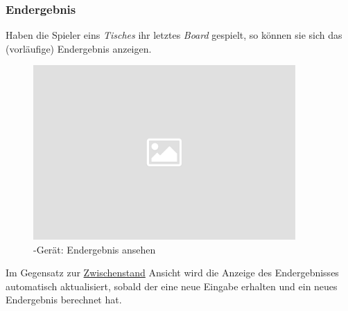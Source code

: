 \subsubsection{Endergebnis}

\noindent
Haben die Spieler eins \textit{Tisches} ihr letztes \textit{Board} gespielt, so können sie sich das (vorläufige) Endergebnis anzeigen.\\[.1cm]

\noindent
\begin{figure}[ht]
	\centering
  \includegraphics[width=10cm]{pictures/placeholder.png}
	\caption{\cli-Gerät: Endergebnis ansehen}
	\label{pic/cli_5_result}
\end{figure}

\noindent
Im Gegensatz zur \hyperref[cli/curres]{Zwischenstand} Ansicht wird die Anzeige des Endergebnisses automatisch aktualisiert, sobald der \ser eine neue Eingabe erhalten und ein neues Endergebnis berechnet hat.
